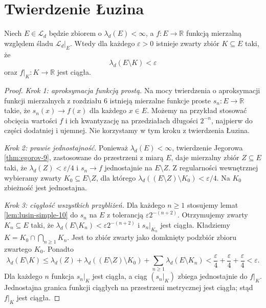 \section{Twierdzenie Łuzina}

\begin{twierdzenie}[Łuzin]
\label{thm:lusin-10}
Niech $E\in\mathcal L_d$ będzie zbiorem o
$\lambda_d(E)<\infty$, a $f:E\to\mathbb R$
funkcją mierzalną względem śladu
$\mathcal L_d|_E$. Wtedy dla każdego
$\varepsilon>0$ istnieje zwarty zbiór
$K\subseteq E$ taki, że
\begin{equation}\label{eq:lusin-measure-10}
\lambda_d(E\setminus K)<\varepsilon
\end{equation}
oraz $f|_K:K\to\mathbb R$ jest ciągła.
\end{twierdzenie}
\begin{proof}
\textit{Krok 1: aproksymacja funkcją prostą.}
Na mocy twierdzenia o aproksymacji funkcji
mierzalnych z rozdziału 6 istnieją mierzalne
funkcje proste $s_n:E\to\mathbb R$ takie, że
$s_n(x)\to f(x)$ dla każdego $x\in E$.
Możemy na przykład stosować obcięcia wartości
$f$ i ich kwantyzację na przedziałach długości
$2^{-n}$, najpierw do części dodatniej i ujemnej.
Nie korzystamy w tym kroku z twierdzenia Łuzina.

\textit{Krok 2: prawie jednostajność.}
Ponieważ $\lambda_d(E)<\infty$, twierdzenie
Jegorowa \ref{thm:egorov-9}, zastosowane do
przestrzeni z miarą $E$, daje mierzalny zbiór
$Z\subseteq E$ taki, że
$\lambda_d(Z)<\varepsilon/4$ i $s_n\to f$
jednostajnie na $E\setminus Z$.
Z regularności wewnętrznej wybieramy zwarty
$K_0\subseteq E\setminus Z$, dla którego
$\lambda_d((E\setminus Z)\setminus K_0)<\varepsilon/4$.
Na $K_0$ zbieżność jest jednostajna.

\textit{Krok 3: ciągłość wszystkich przybliżeń.}
Dla każdego $n\ge1$ stosujemy lemat
\ref{lem:lusin-simple-10} do $s_n$ na $E$
z tolerancją $\varepsilon 2^{-(n+2)}$.
Otrzymujemy zwarty $K_n\subseteq E$ taki, że
$\lambda_d(E\setminus K_n)<
\varepsilon2^{-(n+2)}$ i $s_n|_{K_n}$ jest ciągła.
Kładziemy
$K=K_0\cap\bigcap_{n\ge1}K_n$.
Jest to zbiór zwarty jako domknięty podzbiór
zbioru zwartego $K_0$. Ponadto
\[
\lambda_d(E\setminus K)
\le\lambda_d(Z)+
\lambda_d((E\setminus Z)\setminus K_0)+
\sum_{n\ge1}\lambda_d(E\setminus K_n)
<\frac\varepsilon4+\frac\varepsilon4+
\frac\varepsilon4<\varepsilon.
\]
Dla każdego $n$ funkcja $s_n|_K$ jest ciągła,
a ciąg $(s_n|_K)$ zbiega jednostajnie do $f|_K$.
Jednostajna granica funkcji ciągłych na przestrzeni
metrycznej jest ciągła; stąd $f|_K$ jest ciągła.
\end{proof}

